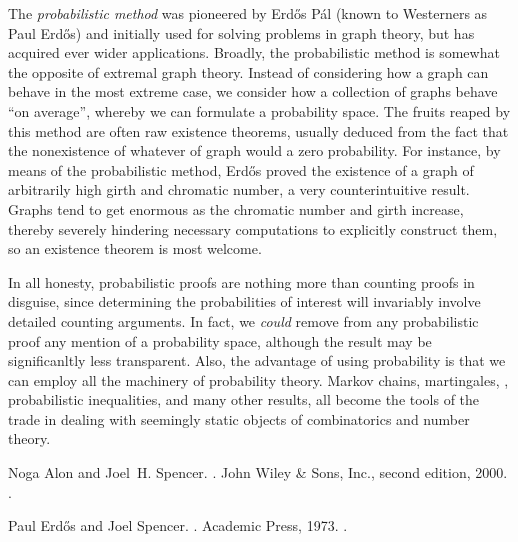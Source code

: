 \documentclass[12pt]{article}
\begin{document}
The \emph{probabilistic method} was pioneered by Erd\H{o}s P\'al (known to Westerners as Paul Erd\H{o}s) and initially used for solving problems in graph theory, but has acquired ever wider applications.  Broadly, the probabilistic method is somewhat the opposite of extremal graph theory.  Instead of considering how a graph can behave in the most extreme case, we consider how a collection of graphs behave ``on average'', whereby we can formulate a probability space.  The fruits reaped by this method are often raw existence theorems, usually deduced from the fact that the nonexistence of whatever  of graph would  a zero probability.  For instance, by means of the probabilistic method, Erd\H{o}s proved the existence of a graph of arbitrarily high girth and chromatic number, a very counterintuitive result.  Graphs tend to get enormous as the chromatic number and girth increase, thereby severely hindering necessary computations to explicitly construct them, so an existence theorem is most welcome.

In all honesty, probabilistic proofs are nothing more than counting proofs in disguise, since determining the probabilities of interest will invariably involve detailed counting arguments.  In fact, we \emph{could} remove from any probabilistic proof any mention of a probability space, although the result may be significanltly less transparent.  Also, the advantage of using probability is that we can employ all the machinery of probability theory.  Markov chains, martingales, , probabilistic inequalities, and many other results, all become the tools of the trade in dealing with seemingly static objects of combinatorics and number theory.

\begin{thebibliography}{1}

Noga Alon and Joel~H. Spencer.
.
\newblock John Wiley \& Sons, Inc., second edition, 2000.
\newblock {}.

Paul Erd{\H{o}}s and Joel Spencer.
.
\newblock Academic Press, 1973.
\newblock {}.

\end{thebibliography}

%
%
\end{document}
